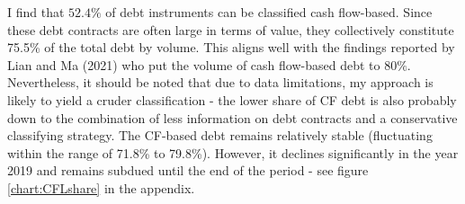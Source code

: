 \documentclass[12pt]{article}
\begin{document}
I find that $52.4\%$ of debt instruments can be classified cash flow-based. Since these debt contracts are often large in terms of value, they collectively constitute 75.5\% of the total debt by volume. This aligns well with the findings reported by Lian and Ma (2021) who put the volume of cash flow-based debt to $80\%$. Nevertheless, it should be noted that due to data limitations, my approach is likely to yield a cruder classification - the lower share of CF debt is also probably down to the combination of less information on debt contracts and a conservative classifying strategy. The CF-based debt remains relatively stable (fluctuating within the range of 71.8\% to 79.8\%). However, it declines significantly in the year 2019 and remains subdued until the end of the period - see figure \ref{chart:CFLshare} in the appendix. 
\end{document}

